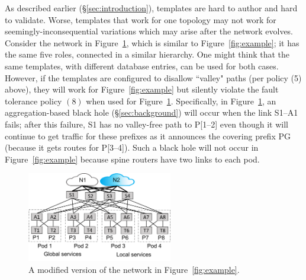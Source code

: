 \documentclass[numbers, 10pt, preprint]{sigplanconf}
\begin{document}

As described earlier (\S\ref{sec:introduction}), templates are hard to author and hard to validate. Worse, templates that work for one topology may not work for seemingly-inconsequential variations which may arise after the network evolves.
Consider the network in Figure~\ref{fig:example2}, which is similar to Figure~\ref{fig:example}; it has the same five roles, connected in a similar hierarchy. One might think that the same templates, with different database entries, can be used for both cases. However, if the templates are configured to disallow ``valley" paths (per policy (5) above), they will work for Figure~\ref{fig:example} but silently violate the fault tolerance policy $(8)$ when used for Figure~\ref{fig:example2}.  Specifically, in Figure~\ref{fig:example2}, an aggregation-based black hole (\S\ref{sec:background}) will occur when the link S1--A1 fails; after this failure, S1 has no valley-free path to P[1--2] even though it will continue to get traffic for these prefixes as it announces the covering prefix PG (because it gets routes for P[3--4]). Such a black hole will not occur in Figure~\ref{fig:example} because spine routers have two links to each pod.


\begin{figure}[t!]
  \centering
  \includegraphics[width=2.5in]{figures/example2}
  \vspace{-.8em}
  \caption{A modified version of the network in Figure~\ref{fig:example}.}
  \label{fig:example2}
  \vspace{-.8em}
\end{figure}
\end{document}
